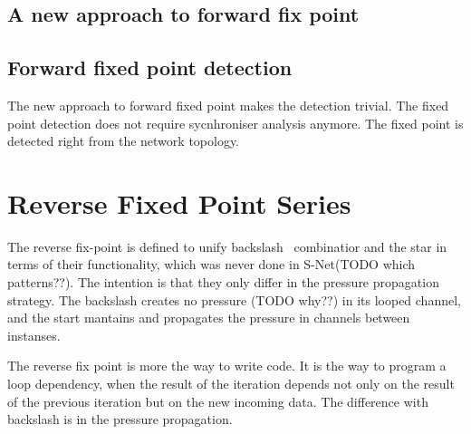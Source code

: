     \subsection{A new approach to forward fix point}
%

    \subsection{Forward fixed point detection\label{ffp_detect}}
The new approach to forward fixed point makes the detection trivial. The fixed point detection does not require sycnhroniser analysis anymore. The fixed point is detected right from the network topology.


    \section{Reverse Fixed Point Series\label{rfp}}
The reverse fix-point is defined to unify backslash \ combinatior and the star in terms of their functionality, which was never done in S-Net(TODO which patterns??). The intention is that they only differ in the pressure propagation strategy. The backslash creates no pressure (TODO why??) in its looped channel, and the start mantains and propagates the pressure in channels between instanses.

%
%
%
%

The reverse fix point is more the way to write code. It is the way to program a loop dependency, when the result of the iteration depends not only on the result of the previous iteration but on the new incoming data. The difference with backslash is in the pressure propagation.

